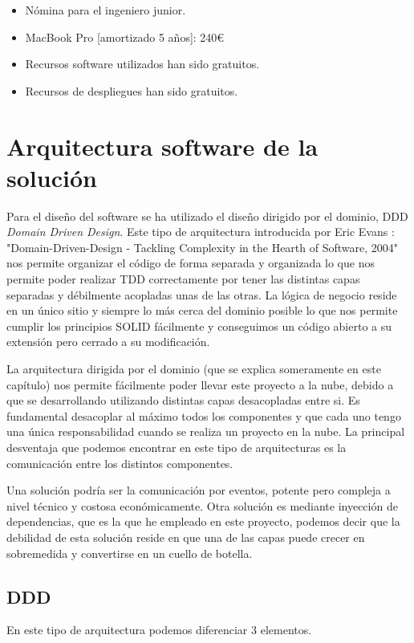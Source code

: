 \begin{itemize}
    \item Nómina para el ingeniero junior.
    \item MacBook Pro [amortizado 5 años]: 240€
    \item Recursos software utilizados han sido gratuitos.
    \item Recursos de despliegues han sido gratuitos.
\end{itemize}

\section{Arquitectura software de la solución}
Para el diseño del software se ha utilizado el diseño dirigido por el dominio, DDD \textit{Domain Driven Design}. Este tipo de arquitectura introducida por Eric Evans \cite{ddd_book}: "Domain-Driven-Design - Tackling Complexity in the Hearth of Software, 2004" nos permite organizar el código de forma separada y organizada lo que nos permite poder realizar TDD correctamente por tener las distintas capas separadas y débilmente acopladas unas de las otras. La lógica de negocio reside en un único sitio y siempre lo más cerca del dominio posible lo que nos permite cumplir los principios SOLID fácilmente y conseguimos un código abierto a su extensión pero cerrado a su modificación. 

La arquitectura dirigida por el dominio (que se explica someramente en este capítulo) nos permite fácilmente poder llevar este proyecto a la nube, debido a que se desarrollando utilizando distintas capas desacopladas entre si. Es fundamental desacoplar al máximo todos los componentes y que cada uno tengo una única responsabilidad cuando se realiza un proyecto en la nube. La principal desventaja que podemos encontrar en este tipo de arquitecturas es la comunicación entre los distintos componentes. 

Una solución podría ser la comunicación por eventos, potente pero compleja a nivel técnico y costosa económicamente. Otra solución es mediante inyección de dependencias, que es la que he empleado en este proyecto, podemos decir que la debilidad de esta solución reside en que una de las capas puede crecer en sobremedida y convertirse en un cuello de botella.

\subsection{DDD}
En este tipo de arquitectura podemos diferenciar 3 elementos.

